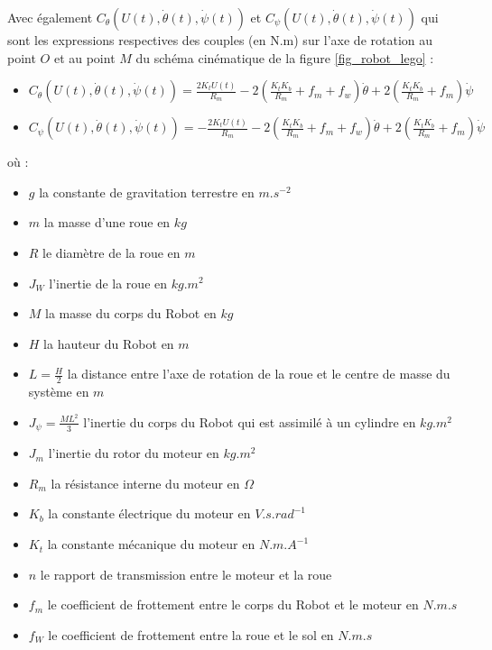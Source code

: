 \documentclass[a4paper]{article}
\begin{document}
                        Avec également $C_{\theta} (U(t), \dot \theta (t), \dot \psi (t))$ et $C_{\psi} (U(t), \dot \theta (t), \dot \psi (t))$
                        qui sont les expressions respectives des couples (en N.m) sur l'axe de rotation au point $O$ et au point $M$ du
                        schéma cinématique de la figure \ref{fig_robot_lego} :
                        \begin{itemize}
                                \item $C_{\theta} (U(t), \dot \theta (t), \dot \psi (t)) = \frac{2K_t U(t)}{R_m} - 2 \left( \frac{K_t K_b}{R_m} + f_m + f_w \right) \dot \theta + 2 \left( \frac{K_t K_b}{R_m} + f_m \right) \dot \psi$
                                \item $C_{\psi} (U(t), \dot \theta (t), \dot \psi (t)) = - \frac{2K_t U(t)}{R_m} - 2 \left( \frac{K_t K_b}{R_m} + f_m + f_w \right) \dot \theta + 2 \left( \frac{K_t K_b}{R_m} + f_m \right) \dot \psi$
                        \end{itemize}
                        où :
                        \begin{itemize}
                                \item $g$ la constante de gravitation terrestre en $m.s^{-2}$
                                \item $m$ la masse d'une roue en $kg$
                                \item $R$ le diamètre de la roue en $m$
                                \item $J_W$ l'inertie de la roue en $kg.m^2$
                                \item $M$ la masse du corps du Robot en $kg$
                                \item $H$ la hauteur du Robot en $m$
                                \item $L=\frac{H}{2}$ la distance entre l'axe de rotation de la roue et le centre de masse du système en $m$
                                \item $J_{\psi} = \frac{ML^2}{3}$ l'inertie du corps du Robot qui est assimilé à un cylindre en $kg.m^2$
                                \item $J_m$ l'inertie du rotor du moteur en $kg.m^2$
                                \item $R_m$ la résistance interne du moteur en $\Omega$
                                \item $K_b$ la constante électrique du moteur en $V.s.rad^{-1}$
                                \item $K_t$ la constante mécanique du moteur en $N.m.A^{-1}$
                                \item $n$ le rapport de transmission entre le moteur et la roue
                                \item $f_m$ le coefficient de frottement entre le corps du Robot et le moteur en $N.m.s$
                                \item $f_W$ le coefficient de frottement entre la roue et le sol en $N.m.s$
                        \end{itemize}
\end{document}
